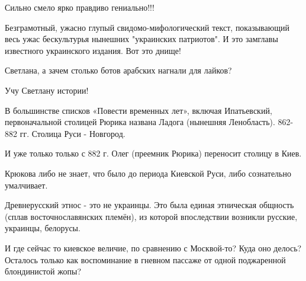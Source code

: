 \begin{itemize}
 
Сильно смело ярко правдиво гениально!!!

 
Безграмотный, ужасно глупый свидомо-мифологический текст, показывающий весь ужас бескультурья нынешних "украинских патриотов". И это замглавы известного украинского издания. Вот это днище!

 
Светлана, а зачем столько ботов арабских нагнали для лайков?

 

Учу Светлану истории!

В большинстве списков «Повести временных лет», включая Ипатьевский,
первоначальной столицей Рюрика названа Ладога (нынешняя Ленобласть).  862-882
гг. Столица Руси - Новгород.

И уже только только с 882 г. Олег (преемник Рюрика) переносит столицу в Киев.

Крюкова либо не знает, что было до периода Киевской Руси, либо сознательно
умалчивает.

Древнерусский этнос - это не украинцы. Это была единая этническая общность
(сплав восточнославянских племён), из которой впоследствии возникли русские,
украинцы, белорусы.

И где сейчас то киевское величие, по сравнению с Москвой-то? Куда оно делось?
Осталось только как воспоминание в гневном пассаже от одной поджаренной
блондинистой жопы?

 

\end{itemize}
